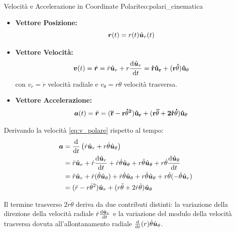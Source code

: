 \begin{teorema}{Velocità e Accelerazione in Coordinate Polari}{teo:polari_cinematica}
\begin{itemize}
    \item \textbf{Vettore Posizione:}
    \begin{equation}
        \bm{r}(t) = r(t)\hat{\bm{u}}_r(t)
    \end{equation}
    \item \textbf{Vettore Velocità:}
    \begin{equation}
        \bm{v}(t) = \dot{\bm{r}} = \dot{r}\hat{\bm{u}}_r + r\frac{\mathrm{d} \hat{\bm{u}}_r}{\mathrm{d} t} = \mathbf{\dot{r}\hat{\bm{u}}_r + (r\dot{\theta})\hat{\bm{u}}_\theta}
        \label{eq:v_polare}
    \end{equation}
    con $v_r = \dot{r}$ velocità radiale e $v_\theta = r\dot{\theta}$ velocità trasversa.
    \item \textbf{Vettore Accelerazione:}
    \begin{equation}
        \bm{a}(t) = \ddot{\bm{r}} = \mathbf{(\ddot{r} - r\dot{\theta}^2)\hat{\bm{u}}_r + (r\ddot{\theta} + 2\dot{r}\dot{\theta})\hat{\bm{u}}_\theta}
        \label{eq:a_polare}
    \end{equation}
\end{itemize}
\end{teorema}

\begin{dimostrazione}
Derivando la velocità \eqref{eq:v_polare} rispetto al tempo:
\begin{align*}
    \bm{a} &= \frac{\mathrm{d} }{\mathrm{d} t}\left(\dot{r}\hat{\bm{u}}_r + r\dot{\theta}\hat{\bm{u}}_\theta\right) \\
    &= \ddot{r}\hat{\bm{u}}_r + \dot{r}\frac{\mathrm{d} \hat{\bm{u}}_r}{\mathrm{d} t} + \dot{r}\dot{\theta}\hat{\bm{u}}_\theta + r\ddot{\theta}\hat{\bm{u}}_\theta + r\dot{\theta}\frac{\mathrm{d} \hat{\bm{u}}_\theta}{\mathrm{d} t} \\
    &= \ddot{r}\hat{\bm{u}}_r + \dot{r}(\dot{\theta}\hat{\bm{u}}_\theta) + \dot{r}\dot{\theta}\hat{\bm{u}}_\theta + r\ddot{\theta}\hat{\bm{u}}_\theta + r\dot{\theta}(-\dot{\theta}\hat{\bm{u}}_r) \\
    &= (\ddot{r} - r\dot{\theta}^2)\hat{\bm{u}}_r + (r\ddot{\theta} + 2\dot{r}\dot{\theta})\hat{\bm{u}}_\theta
\end{align*}
\end{dimostrazione}

\begin{osservazione}
Il termine trasverso $2\dot{r}\dot{\theta}$ deriva da due contributi distinti: la variazione della direzione della velocità radiale $\dot{r}\frac{\mathrm{d} \hat{\bm{u}}_r}{\mathrm{d} t}$ e la variazione del modulo della velocità trasversa dovuta all'allontanamento radiale $\frac{\mathrm{d} }{\mathrm{d} t}(r)\dot{\theta}\hat{\bm{u}}_\theta$.
\end{osservazione}


